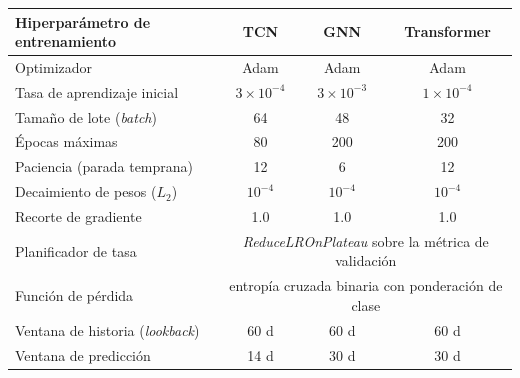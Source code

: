 \begin{table}[ht!]
  \centering
  \small
  \begin{tabular}{@{}lccc@{}}
    \toprule
    \textbf{Hiperparámetro de entrenamiento} & \textbf{TCN}                                                                  & \textbf{GNN}     & \textbf{Transformer} \\
    \midrule
    Optimizador                              & Adam                                                                          & Adam             & Adam                 \\
    Tasa de aprendizaje inicial              & $3\times10^{-4}$                                                              & $3\times10^{-3}$ & $1\times10^{-4}$     \\
    Tamaño de lote (\textit{batch})          & 64                                                                            & 48               & 32                   \\
    Épocas máximas                           & 80                                                                            & 200              & 200                  \\
    Paciencia (parada temprana)              & 12                                                                            & 6                & 12                   \\
    Decaimiento de pesos ($L_2$)             & $10^{-4}$                                                                     & $10^{-4}$        & $10^{-4}$            \\
    Recorte de gradiente                     & 1.0                                                                           & 1.0              & 1.0                  \\
    Planificador de tasa                     & \multicolumn{3}{c}{\textit{ReduceLROnPlateau} sobre la métrica de validación}                                           \\
    Función de pérdida                       & \multicolumn{3}{c}{entropía cruzada binaria con ponderación de clase}                                                   \\
    Ventana de historia (\textit{lookback})  & 60 d                                                                          & 60 d             & 60 d                 \\
    Ventana de predicción                    & 14 d                                                                          & 30 d             & 30 d                 \\

\end{tabular}
\end{table}
